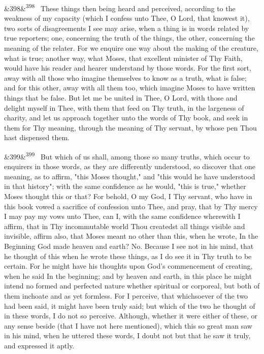 \documentclass[12pt]{article}
\newcommand{\para}[1][]{\par\noindent\ifx&#1&\else\textsuperscript{\footnotesize #1}~\fi}
\begin{document}
\para[398] These things then being heard and perceived, according to the weakness of my capacity (which I confess unto Thee, O Lord, that knowest it), two sorts of disagreements I see may arise, when a thing is in words related by true reporters; one, concerning the truth of the things, the other, concerning the meaning of the relater. For we enquire one way about the making of the creature, what is true; another way, what Moses, that excellent minister of Thy Faith, would have his reader and hearer understand by those words. For the first sort, away with all those who imagine themselves to know as a truth, what is false; and for this other, away with all them too, which imagine Moses to have written things that be false. But let me be united in Thee, O Lord, with those and delight myself in Thee, with them that feed on Thy truth, in the largeness of charity, and let us approach together unto the words of Thy book, and seek in them for Thy meaning, through the meaning of Thy servant, by whose pen Thou hast dispensed them.

\para[399] But which of us shall, among those so many truths, which occur to enquirers in those words, as they are differently understood, so discover that one meaning, as to affirm, "this Moses thought," and "this would he have understood in that history"; with the same confidence as he would, "this is true," whether Moses thought this or that? For behold, O my God, I Thy servant, who have in this book vowed a sacrifice of confession unto Thee, and pray, that by Thy mercy I may pay my vows unto Thee, can I, with the same confidence wherewith I affirm, that in Thy incommutable world Thou createdst all things visible and invisible, affirm also, that Moses meant no other than this, when he wrote, In the Beginning God made heaven and earth? No. Because I see not in his mind, that he thought of this when he wrote these things, as I do see it in Thy truth to be certain. For he might have his thoughts upon God's commencement of creating, when he said In the beginning; and by heaven and earth, in this place he might intend no formed and perfected nature whether spiritual or corporeal, but both of them inchoate and as yet formless. For I perceive, that whichsoever of the two had been said, it might have been truly said; but which of the two he thought of in these words, I do not so perceive. Although, whether it were either of these, or any sense beside (that I have not here mentioned), which this so great man saw in his mind, when he uttered these words, I doubt not but that he saw it truly, and expressed it aptly.
\end{document}
